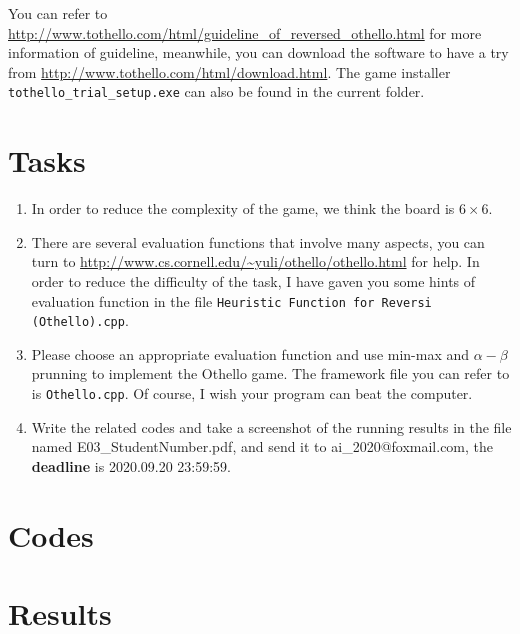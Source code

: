﻿\documentclass[a4paper, 11pt]{article}
\begin{document}
You can refer to \url{http://www.tothello.com/html/guideline_of_reversed_othello.html} for more information of guideline, meanwhile, you can download the software to have a try from \url{http://www.tothello.com/html/download.html}. The game installer \texttt{tothello\_trial\_setup.exe} can also be found in the current folder.



\section{Tasks}
\begin{enumerate}

\item In order to reduce the complexity of the game, we think the board is $6\times 6$.

\item There are several evaluation functions that involve many aspects, you can turn to \url{http://www.cs.cornell.edu/~yuli/othello/othello.html} for help. In order to reduce the difficulty of the task, I have gaven you some hints of evaluation function in the file \texttt{Heuristic Function for Reversi (Othello).cpp}.

\item Please choose an appropriate evaluation function and use min-max and $\alpha-\beta$ prunning to implement the Othello game. The framework file you can refer to is \texttt{Othello.cpp}. Of course, I wish your program can beat the computer.

\item Write the related codes and take a screenshot of the running results in the file named \textsf{E03\_StudentNumber.pdf}, and send it to \textsf{ai\_2020@foxmail.com}, the \textbf{deadline} is 2020.09.20 23:59:59.
\end{enumerate}

\section{Codes}

\section{Results}


%
%
\end{document}
